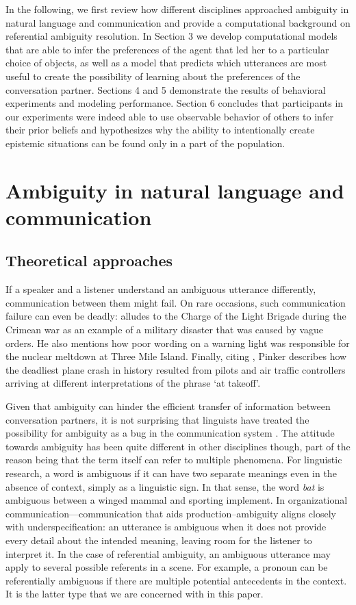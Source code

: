 \documentclass[10pt,a4paper]{article}
\begin{document}
In the following, we first review how different disciplines approached ambiguity in natural language and communication and provide a computational background on referential ambiguity resolution. 
In Section 3 we develop computational models that are able to infer the preferences of the agent that led her to a particular choice of objects, as well as a model that predicts which utterances are most useful to create the possibility of learning about the preferences of the conversation partner. 
Sections 4 and 5 demonstrate the results of behavioral experiments and modeling performance. 
Section 6 concludes that participants in our experiments were indeed able to use observable behavior of others to infer their prior beliefs and hypothesizes why the ability to intentionally create epistemic situations can be found only in a part of the population.

\section{Ambiguity in natural language and communication}
\subsection{Theoretical approaches}

If a speaker and a listener understand an ambiguous utterance differently, communication between them might fail.
On rare occasions, such communication failure can even be deadly: 
 alludes to the Charge of the Light Brigade during the Crimean war as an example of a military disaster that was caused by vague orders.
He also mentions how poor wording on a warning light was responsible for the nuclear meltdown at Three Mile Island. Finally, citing , Pinker describes how the deadliest plane crash in history resulted from pilots and air traffic controllers arriving at different interpretations of the phrase `at takeoff'.

Given that ambiguity can hinder the efficient transfer of information between conversation partners, it is not surprising that linguists have treated the possibility for ambiguity as a bug in the communication system \cite{grice1975,chomsky2002minimalism}. The attitude towards ambiguity has been quite different in other disciplines though, part of the reason being that the term itself can refer to multiple phenomena. For linguistic research, a word is ambiguous if it can have two separate meanings even in the absence of context, simply as a linguistic sign. In that sense, the word \textit{bat} is ambiguous between a winged mammal and sporting implement. In organizational communication---communication that aids production--ambiguity aligns closely with underspecification: an utterance is ambiguous when it does not provide every detail about the intended meaning, leaving room for the listener to interpret it. In the case of referential ambiguity, an ambiguous utterance may apply to several possible referents in a scene. For example, a pronoun can be referentially ambiguous if there are multiple potential antecedents in the context. It is the latter type that we are concerned with in this paper.
\end{document}
